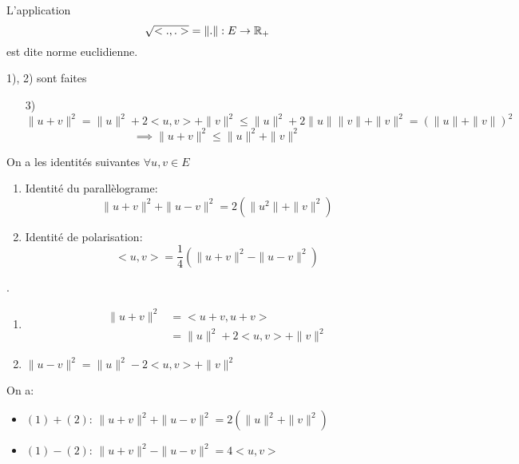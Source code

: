 \begin{lemma}
   L'application
   \[
   \sqrt{<.,.>} = \| . \|: E \to \mathbb{R}_+ 
   \] 
   est dite norme euclidienne.
\end{lemma}
\begin{explanation}
    1), 2) sont faites\\
    \begin{itemize}
        \item[3)] $\| u + v \|^2 = \|u\|^2 + 2<u,v> + \|v\|^2 \le \|u\|^2 + 2\|u\|\|v\| + \|v\|^2 = (\|u\| + \|v\|)^2$
            \[
            \implies \|u + v\|^2 \le \|u\|^2 + \|v\|^2
            \] 
    \end{itemize}
\end{explanation}
\begin{prop}
   On a les identités suivantes $\forall u, v \in E$ 
   \begin{enumerate}
       \item Identité du parallèlograme:
           \[
           \|u + v\|^2 + \|u - v\|^2 = 2(\|u^2\| + \|v\|^2)
           \] 
       \item Identité de polarisation:
           \[
           <u, v> = \frac{1}{4}(\|u + v\|^2 - \|u - v\|^2)
           \] 
   \end{enumerate}
\end{prop}
\begin{explanation}.
   \begin{enumerate}
       \item 
           \begin{align*}
               \|u + v\|^2 &= <u + v, u + v>\\
                           &= \|u\|^2 + 2<u,v> + \|v\|^2
           \end{align*}
        \item $\|u - v\|^2 = \|u\|^2 - 2<u, v> + \|v\|^2$
   \end{enumerate} 
   On a:
   \begin{itemize}
       \item 
           $(1) + (2)$:  $\|u + v\|^2 + \|u - v\|^2 = 2 (\|u\|^2 + \|v\|^2)$
       \item $(1) - (2)$:  $\|u + v\|^2 - \|u - v\|^2 = 4<u, v>$ 
   \end{itemize}
\end{explanation}
